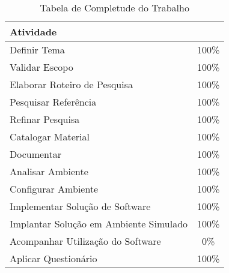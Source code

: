 \begin{table}[h!]
\centering
\caption{Tabela de Completude do Trabalho}
\label{tbl:table_status}
\begin{tabular}{lc}
\rowcolor[HTML]{9A0000} 
{\color[HTML]{FFFFFF} \textbf{Atividade}} & \multicolumn{1}{l}{\cellcolor[HTML]{9A0000}{\color[HTML]{FFFFFF} \textbf{Status}}} \\ \hline
Definir Tema                              & 100\%                                                                              \\ \hline
Validar Escopo                            & 100\%                                                                              \\ \hline
Elaborar Roteiro de Pesquisa              & 100\%                                                                              \\ \hline
Pesquisar Referência                      & 100\%                                                                              \\ \hline
Refinar Pesquisa                          & 100\%                                                                              \\ \hline
Catalogar Material                        & 100\%                                                                              \\ \hline
Documentar                                & 100\%                                                                               \\ \hline
Analisar Ambiente                         & 100\%                                                                               \\ \hline
Configurar Ambiente                       & 100\%                                                                                \\ \hline
Implementar Solução de Software           & 100\%                                                                                \\ \hline
Implantar Solução em Ambiente Simulado    & 100\%                                                                                \\ \hline
Acompanhar Utilização do Software         & 0\%                                                                                \\ \hline
Aplicar Questionário                      & 100\%                                                                                \\ \hline
\end{tabular}
\end{table}

